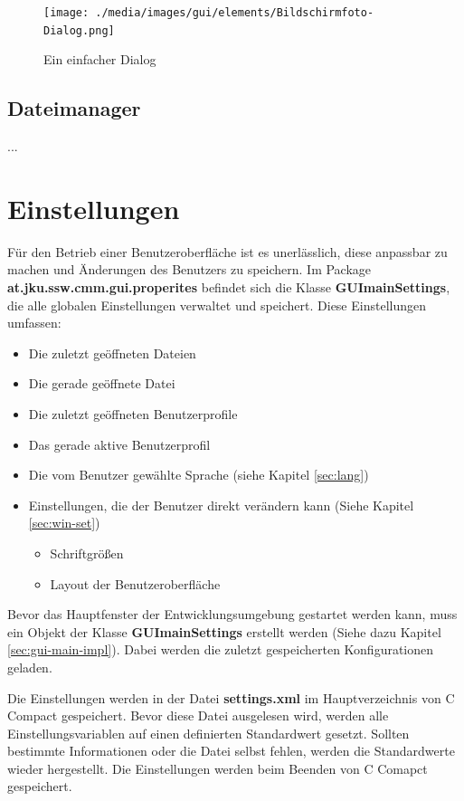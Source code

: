 \begin{figure}[htp]
\centering
\texttt{[image: ./media/images/gui/elements/Bildschirmfoto-Dialog.png]}
\caption{Ein einfacher Dialog}
\label{fig:win-dialog}
\end{figure}

\subsection{Dateimanager}
...

\section{Einstellungen}
\label{sec:guimainsettings}
Für den Betrieb einer Benutzeroberfläche ist es unerlässlich, diese anpassbar zu machen und Änderungen des Benutzers zu speichern. Im Package \textbf{at.jku.ssw.cmm.gui.properites} befindet sich die Klasse \textbf{GUImainSettings}, die alle globalen Einstellungen verwaltet und speichert. Diese Einstellungen umfassen:
\begin{itemize}
\item Die zuletzt geöffneten Dateien
\item Die gerade geöffnete Datei
\item Die zuletzt geöffneten Benutzerprofile
\item Das gerade aktive Benutzerprofil
\item Die vom Benutzer gewählte Sprache (siehe Kapitel \ref{sec:lang})
\item Einstellungen, die der Benutzer direkt verändern kann (Siehe Kapitel \ref{sec:win-set})
\begin{itemize}
\item Schriftgrößen
\item Layout der Benutzeroberfläche
\end{itemize}
\end{itemize}

Bevor das Hauptfenster der Entwicklungsumgebung gestartet werden kann, muss ein Objekt der Klasse \textbf{GUImainSettings} erstellt werden (Siehe dazu Kapitel \ref{sec:gui-main-impl}). Dabei werden die zuletzt gespeicherten Konfigurationen geladen.

Die Einstellungen werden in der Datei \textbf{settings.xml} im Hauptverzeichnis von C Compact gespeichert. Bevor diese Datei ausgelesen wird, werden alle Einstellungsvariablen auf einen definierten Standardwert gesetzt. Sollten bestimmte Informationen oder die Datei selbst fehlen, werden die Standardwerte wieder hergestellt. Die Einstellungen werden beim Beenden von C Comapct gespeichert.

